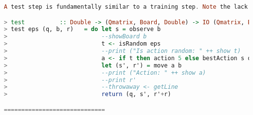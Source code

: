 \documentclass[12pt,a4paper]{article}
\begin{document}
\begin{lstlisting}[language=Haskell,numbers=none,basicstyle=\tiny]
A test step is fundamentally similar to a training step. Note the lack of a call to updateQ.

> test          :: Double -> (Qmatrix, Board, Double) -> IO (Qmatrix, Board, Double)
> test eps (q, b, r)   = do let s = observe b
>                           --showBoard b
>                           t <- isRandom eps
>                           --print ("Is action random: " ++ show t)
>                           a <- if t then action 5 else bestAction s q
>                           let (s', r') = move a b
>                           --print ("Action: " ++ show a)
>                           --print r'
>                           --throwaway <- getLine
>                           return (q, s', r'+r)

=============================
	\end{lstlisting}
\end{document}

